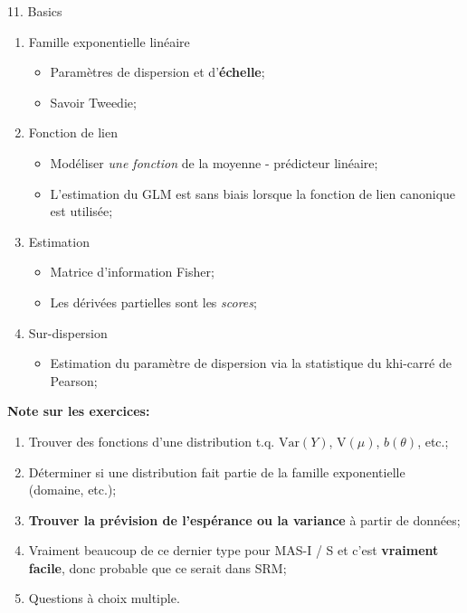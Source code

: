 \documentclass[12pt, titlepage, french]{report}
\begin{document}
\begin{CHPT_SUMM}[label = {GLM-BASICS}]{11. Basics}
\begin{enumerate}
	\item	Famille exponentielle linéaire
	\begin{itemize}
		\item	Paramètres de dispersion et d'\textbf{échelle};
		\item	Savoir Tweedie;
	\end{itemize}
	\item	Fonction de lien
	\begin{itemize}
		\item	Modéliser \textit{une fonction} de la moyenne - prédicteur linéaire;
		\item	L'estimation du GLM est sans biais lorsque la fonction de lien canonique est utilisée;
	\end{itemize}
	\item	Estimation
	\begin{itemize}
		\item	Matrice d'information Fisher;
		\item	Les dérivées partielles sont les \textit{scores};
	\end{itemize}
	\item	Sur-dispersion
	\begin{itemize}
		\item	Estimation du paramètre de dispersion via la statistique du khi-carré de Pearson;
	\end{itemize}
\end{enumerate}
\textbf{Note sur les exercices:} 
\begin{enumerate}
	\item	Trouver des fonctions d'une distribution t.q. $\text{Var}(Y)$, $\text{V}(\mu)$, $b(\theta)$, etc.;
	\item	Déterminer si une distribution fait partie de la famille exponentielle (domaine, etc.);
	\item	\textbf{Trouver la prévision de l'espérance ou la variance} à partir de données;
	\item[]	Vraiment beaucoup de ce dernier type pour MAS-I / S et c'est \textbf{vraiment facile}, donc probable que ce serait dans SRM;
	\item	Questions à choix multiple.
\end{enumerate}
\end{CHPT_SUMM}
\end{document}

